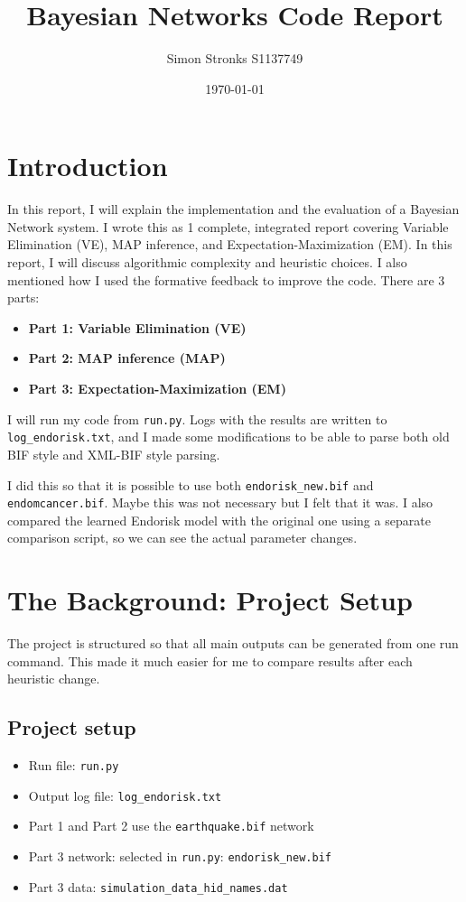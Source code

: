 \documentclass[11pt,a4paper]{article}
\title{\textbf{Bayesian Networks Code Report}}
\author{Simon Stronks S1137749}
\date{\today}
\begin{document}
\maketitle

\newpage
\tableofcontents
\newpage

\section{Introduction}
In this report, I will explain the implementation and the evaluation of a Bayesian Network system. I wrote this as 1 complete, integrated report covering Variable Elimination (VE), MAP inference, and Expectation-Maximization (EM). In this report, I will discuss algorithmic complexity and heuristic choices. I also mentioned how I used the formative feedback to improve the code. There are 3 parts:

\begin{itemize}
    \item \textbf{Part 1: Variable Elimination (VE)}
    \item \textbf{Part 2: MAP inference (MAP)}
    \item \textbf{Part 3: Expectation-Maximization (EM)}
\end{itemize}

I will run my code from \texttt{run.py}. Logs with the results are written to \texttt{log\_endorisk.txt}, and I made some modifications to be able to parse both old BIF style and XML-BIF style parsing.

I did this so that it is possible to use both \texttt{endorisk\_new.bif} and \texttt{endomcancer.bif}. Maybe this was not necessary but I felt that it was.
I also compared the learned Endorisk model with the original one using a separate comparison script, so we can see the actual parameter changes.

\section{The Background: Project Setup}
The project is structured so that all main outputs can be generated from one run command. This made it much easier for me to compare results after each heuristic change.
\subsection{Project setup}
\begin{itemize}
    \item Run file: \texttt{run.py}
    \item Output log file: \texttt{log\_endorisk.txt}
    \item Part 1 and Part 2 use the \texttt{earthquake.bif} network
    \item Part 3 network: selected in \texttt{run.py}: \texttt{endorisk\_new.bif}
    \item Part 3 data: \texttt{simulation\_data\_hid\_names.dat}
\end{itemize}
\end{document}
